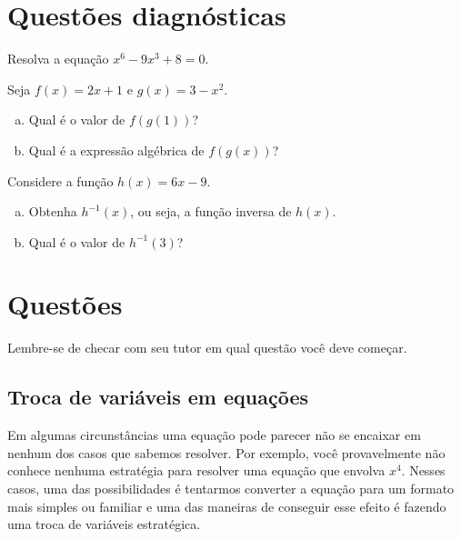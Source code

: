 \documentclass[main_estudante.tex]{subfiles}
\begin{document}
\newpage

\section{Questões diagnósticas}

\begin{diagnostico}
Resolva a equação $x^6-9x^3+8=0$.
\end{diagnostico}

\vspace{3cm}

\begin{diagnostico}
Seja $f(x)=2x+1$ e $g(x)=3-x^2$.
\begin{enumerate}[a)]
  \item Qual é o valor de $f(g(1))$?
  \item Qual é a expressão algébrica de $f(g(x))$?
\end{enumerate}
\end{diagnostico}

\vspace{3cm}

\begin{diagnostico}
Considere a função $h(x)=6x-9$.
\begin{enumerate}[a)]
  \item Obtenha $h^{-1}(x)$, ou seja, a função inversa de $h(x)$.
  \item Qual é o valor de $h^{-1}(3)$?
\end{enumerate}
\end{diagnostico}

\newpage

\section{Questões}

Lembre-se de checar com seu tutor em qual questão você deve começar.

\subsection*{Troca de variáveis em equações}

Em algumas circunstâncias uma equação pode parecer não se encaixar em nenhum dos casos que sabemos resolver. Por exemplo, você provavelmente não conhece nenhuma estratégia para resolver uma equação que envolva $x^4$. Nesses casos, uma das possibilidades é tentarmos converter a equação para um formato mais simples ou familiar e uma das maneiras de conseguir esse efeito é fazendo uma troca de variáveis estratégica.
\end{document}

